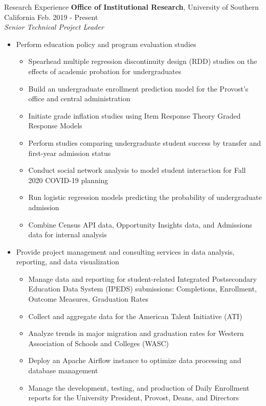 \documentclass{resume} %
\begin{document}
\begin{rSection}{Research Experience}
{\bf Office of Institutional Research}{, University of Southern California} \hfill {Feb. 2019 - Present}\\
{\em Senior Technical Project Leader}
\begin{itemize}[noitemsep]
    \item Perform education policy and program evaluation studies
    \begin{itemize}[noitemsep]
        \item Spearhead multiple regression discontinuity design (RDD) studies on the effects of academic probation for undergraduates
        \item Build an undergraduate enrollment prediction model for the Provost’s office and central administration
        \item Initiate grade inflation studies using Item Response Theory Graded Response Models
        \item Perform studies comparing undergraduate student success by transfer and first-year admission status
        \item Conduct social network analysis to model student interaction for Fall 2020 COVID-19 planning
        \item Run logistic regression models predicting the probability of undergraduate admission
        \item Combine Census API data, Opportunity Insights data, and Admissions data for internal analysis
    \end{itemize}
    \item Provide project management and consulting services in data analysis, reporting, and data visualization
    \begin{itemize}[noitemsep]
        \item Manage data and reporting for student-related Integrated Postsecondary Education Data System (IPEDS) submissions: Completions, Enrollment, Outcome Measures, Graduation Rates
        \item Collect and aggregate data for the American Talent Initiative (ATI)
        \item Analyze trends in major migration and graduation rates for Western Association of Schools and Colleges (WASC)
        \item Deploy an Apache Airflow instance to optimize data processing and database management
        \item Manage the development, testing, and production of Daily Enrollment reports for the University President, Provost, Deans, and Directors    
    \end{itemize}
\end{itemize}


\end{rSection}
\end{document}
